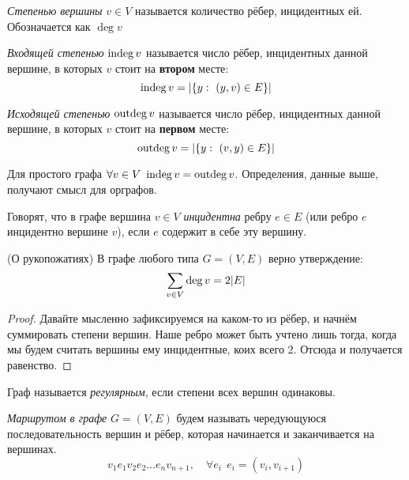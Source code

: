 \begin{multicols}{2}
    \begin{definition}{}{}
      \textit{Степенью вершины} $v \in V$ называется количество рёбер, инцидентных ей. Обозначается как $\deg v$
    \end{definition}
    
    \begin{definition}{}{}
      \textit{Входящей степенью} $\operatorname{indeg} v$ называется число рёбер, инцидентных данной вершине, в которых $v$ стоит на \textbf{втором} месте:
      \[
        \operatorname{indeg} v = |\{y :\  (y, v) \in E\}|
      \]
    \end{definition}
    
    \begin{definition}{}{}
      \textit{Исходящей степенью} $\operatorname{outdeg} v$ называется число рёбер, инцидентных данной вершине, в которых $v$ стоит на \textbf{первом} месте:
      \[
        \operatorname{outdeg} v = |\{y :\  (v, y) \in E\}|
      \]
    \end{definition}
    
    \begin{note}{}{}
      Для простого графа $\forall v \in V\ \operatorname{indeg} v = \operatorname{outdeg} v$. Определения, данные выше, получают смысл для орграфов.
    \end{note}
    
    \begin{definition}{}{}
      Говорят, что в графе вершина $v \in V$ \textit{инцидентна} ребру $e \in E$ (или ребро $e$ инцидентно вершине $v$), если $e$ содержит в себе эту вершину.
    \end{definition}
    
    \begin{lemma}{(О рукопожатиях)}{}
      В графе любого типа $G = (V, E)$ верно утверждение:
      \[
        \sum\limits_{v \in V} \deg v = 2|E|
      \]
    \end{lemma}
    
    \begin{proof}
      Давайте мысленно зафиксируемся на каком-то из рёбер, и начнём суммировать степени вершин. Наше ребро может быть учтено лишь тогда, когда мы будем считать вершины ему инцидентные, коих всего 2. Отсюда и получается равенство.
    \end{proof}
    
    \begin{definition}{}{}
      Граф называется \textit{регулярным}, если степени всех вершин одинаковы.
    \end{definition}
    
    \begin{definition}{}{}
      \textit{Маршрутом в графе} $G = (V, E)$ будем называть чередующуюся последовательность вершин и рёбер, которая начинается и заканчивается на вершинах.
      \[
        v_1 e_1 v_2 e_2 \ldots e_n v_{n + 1}, \quad \forall e_i\ \ e_i = (v_i, v_{i + 1})
      \]
    \end{definition}
    

\end{multicols}
